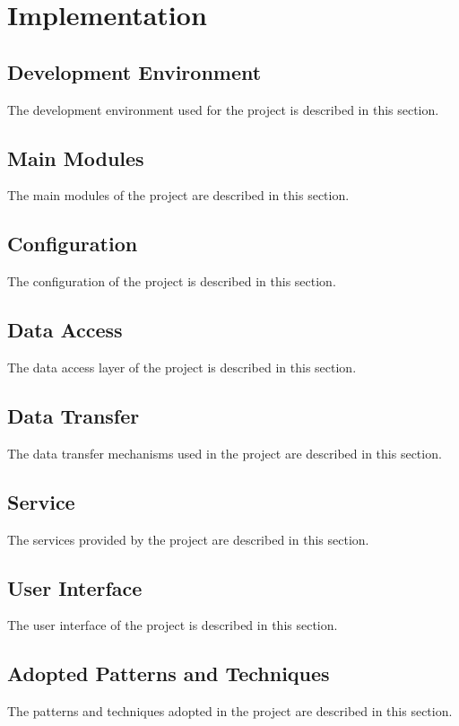 \chapter{Implementation}

\section{Development Environment}

The development environment used for the project is described in this section.

\section{Main Modules}

The main modules of the project are described in this section.

\section{Configuration}

The configuration of the project is described in this section.

\section{Data Access}

The data access layer of the project is described in this section.

\section{Data Transfer}

The data transfer mechanisms used in the project are described in this section.

\section{Service}

The services provided by the project are described in this section.

\section{User Interface}

The user interface of the project is described in this section.

\section{Adopted Patterns and Techniques}

The patterns and techniques adopted in the project are described in this section.
